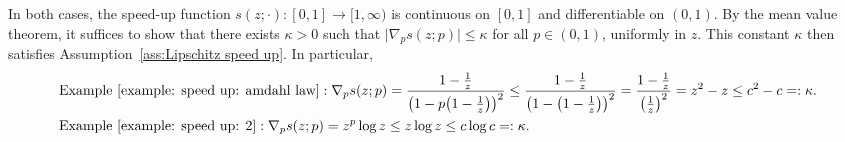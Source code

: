 \documentclass[11pt]{article}
\newcommand{\jp}[1]{\footnote{J-P: #1}}
\theoremstyle{remark}
\theoremstyle{definition}
\numberwithin{equation}{section}
\begin{document}
In both cases, the speed-up function $s(z;\cdot): [0,1] \to [1,\infty)$ is continuous on $[0,1]$ and differentiable on $(0,1)$. By the mean value theorem, it suffices to show that there exists $\kappa>0$ such that $\big\lvert \nabla_p s(z;p) \big\rvert \le \kappa$ for all $p \in (0,1)$, uniformly in $z$. This constant $\kappa$ then satisfies Assumption~\ref{ass:Lipschitz speed up}. In particular, 
\begin{align*}
    &\text{Example } \ref{example: speed up: amdahl law}:  \nabla_p s(z;p) = \frac{1 - \frac{1}{z}}{\big(1 - p\big(1 - \frac{1}{z}\big)\big)^2} \leq \frac{1 - \frac{1}{z}}{\big(1 - \big(1 - \frac{1}{z}\big)\big)^2} = \frac{1 - \frac{1}{z}}{\big(\frac{1}{z}\big)^2} = z^2 - z \leq c^2 - c =: \kappa.
    \\
    &\text{Example } \ref{example: speed up: 2}: \nabla_p s(z;p) = z^p \log z \leq z \log z 
    \leq c \log c =: \kappa.
\end{align*}



\end{document}
